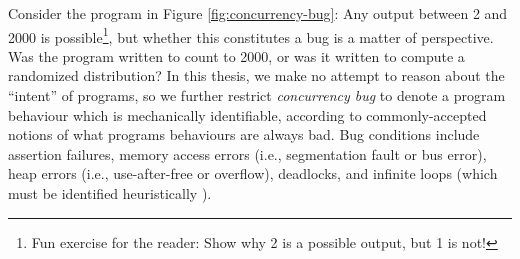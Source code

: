 Consider the program in Figure \ref{fig:concurrency-bug}: Any output between 2 and 2000 is possible\footnote{
	Fun exercise for the reader: Show why 2 is a possible output, but 1 is not!
},
but whether this constitutes a bug is a matter of perspective.
Was the program written to count to 2000, or was it written to compute a randomized distribution?
In this thesis, we make no attempt to reason about the ``intent'' of programs,
so we further restrict {\em concurrency bug} to denote a program behaviour which is mechanically identifiable,
according to commonly-accepted notions of what programs behaviours are always bad.
%
Bug conditions include assertion failures,
memory access errors (i.e., segmentation fault or bus error),
heap errors (i.e., use-after-free or overflow),
deadlocks,
and infinite loops (which must be identified heuristically \cite{entscheidungsproblem}).

